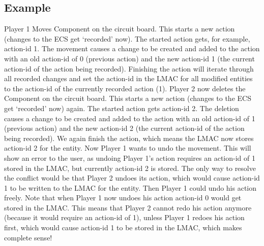 \documentclass[11pt]{article}
\begin{document}
    \subsection{Example}
    Player 1 Moves Component on the circuit board.
    This starts a new action (changes to the ECS get `recorded' now).
    The started action gets, for example, action-id 1.
    The movement causes a change to be created and added to the action with an old action-id of 0 (previous action)
    and the new action-id 1 (the current action-id of the action being recorded).
    Finishing the action will iterate through all recorded changes and set the
    action-id in the LMAC for all modified entities to the action-id of the currently recorded action (1).
    Player 2 now deletes the Component on the circuit board.
    This starts a new action (changes to the ECS get `recorded' now) again.
    The started action gets action-id 2.
    The deletion causes a change to be created and added to the action with an old action-id of 1 (previous action)
    and the new action-id 2 (the current action-id of the action being recorded).
    We again finish the action, which means the LMAC now stores action-id 2 for the entity.
    Now Player 1 wants to undo the movement.
    This will show an error to the user, as undoing Player 1's action requires an action-id of 1 stored in the LMAC, but
    currently action-id 2 is stored.
    The only way to resolve the conflict would be that Player 2 undoes its action, which would cause action-id 1 to be written
    to the LMAC for the entity.
    Then Player 1 could undo his action freely.
    Note that when Player 1 now undoes his action action-id 0 would get stored in the LMAC.
    This means that Player 2 cannot redo his action anymore (because it would require an action-id of 1), unless Player 1
    redoes his action first, which would cause action-id 1 to be stored in the LMAC, which makes complete sense!
\end{document}
